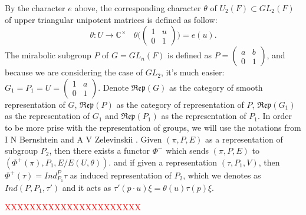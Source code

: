 \documentclass[12pt,a4paper,english]{article}
\theoremstyle{plain}
\theoremstyle{definition}
\begin{document}
By the character $e$ above, the corresponding character $\theta$ of $U_{2}(F)\subset GL_{2}(F)$ of upper triangular
unipotent matrices is defined as follow:
\begin{equation*}
    \theta: U\rightarrow \mathbb{C}^{\times}\ \ \ \ \theta\bigg(\begin{pmatrix}
    1 & u\\
    0 & 1
    \end{pmatrix}\bigg)=e(u).
\end{equation*}
The mirabolic subgroup $P$ of $G=GL_{n}(F)$ is defined as $P=\begin{pmatrix}
a&b\\
0&1
\end{pmatrix}$, and because we are considering the case of $GL_{2}$, it's much easier: $G_{1}=P_{1}=U=\begin{pmatrix}
1 & a\\
0& 1
\end{pmatrix}.$ Denote $\mathfrak{Rep}(G)$ as the category of smooth representation of $G$, $\mathfrak{Rep}(P)$ as the category of representation of $P$, $\mathfrak{Rep}(G_{1})$ as the representation of $G_{1}$ and $\mathfrak{Rep}(P_{1})$ as the representation of $P_{1}$. In order to be more prise with the representation of groups, we will use the notations from  I N Bernshtein and A V Zelevinskii \cite{bernstein1976representations}. Given $(\pi, P, E)$ as a representation of subgroup $P_{2}$, then there exists a functor $\Phi^{-}$ which sends $(\pi,P,E)$ to $(\Phi^{+}(\pi),P_{1}, E/E(U,\theta))$. and if given a representation $(\tau, P_{1}, V)$, then $\Phi^{+}(\tau)=Ind^{P}_{P_{1}}\tau$ as induced representation of $P_{2}$, which we denotes as $Ind(P, P_{1}, \tau')$ and it acts as $\tau'(p\cdot u)\xi=\theta(u)\tau(p)\xi$.

\textcolor{red}{XXXXXXXXXXXXXXXXXXXXXX}
\end{document}
